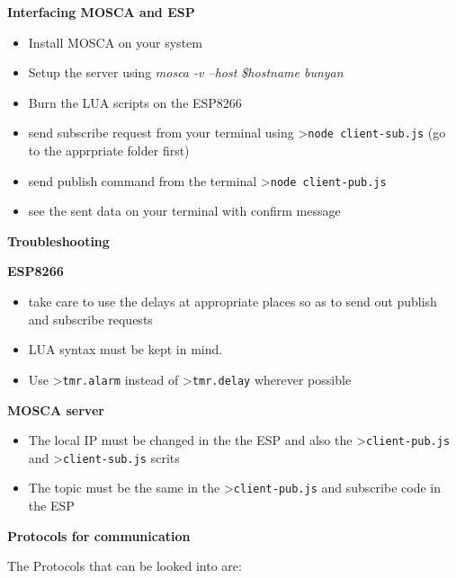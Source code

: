\documentclass[16pt]{article}
\begin{document}
\vspace{15cm}

{\LARGE{\textbf{Interfacing MOSCA and ESP}}}

\begin{itemize}

\item
  Install MOSCA on your system
\item
  Setup the server using \emph{mosca -v --host \$hostname \textbar{}
  bunyan}
\item
  Burn the LUA scripts on the ESP8266
\item
  send subscribe request from your terminal using
  \textgreater{}\texttt{node client-sub.js} (go to the apprpriate folder
  first)
\item
  send publish command from the terminal
  \textgreater{}\texttt{node client-pub.js}
\item
  see the sent data on your terminal with confirm message
\end{itemize}



{\Large{\textbf{Troubleshooting}}}

\textbf{ESP8266}

\begin{itemize}

\item
  take care to use the delays at appropriate places so as to send out
  publish and subscribe requests
\item
  LUA syntax must be kept in mind.
\item
  Use \textgreater{}\texttt{tmr.alarm} instead of
  \textgreater{}\texttt{tmr.delay} wherever possible
\end{itemize}

\textbf{MOSCA server}

\begin{itemize}

\item
  The local IP must be changed in the the ESP and also the
  \textgreater{}\texttt{client-pub.js} and
  \textgreater{}\texttt{client-sub.js} scrits
\item
  The topic must be the same in the \textgreater{}\texttt{client-pub.js}
  and subscribe code in the ESP
\end{itemize}



{\LARGE{\textbf{Protocols for communication}}}

The Protocols that can be looked into are:
\end{document}
